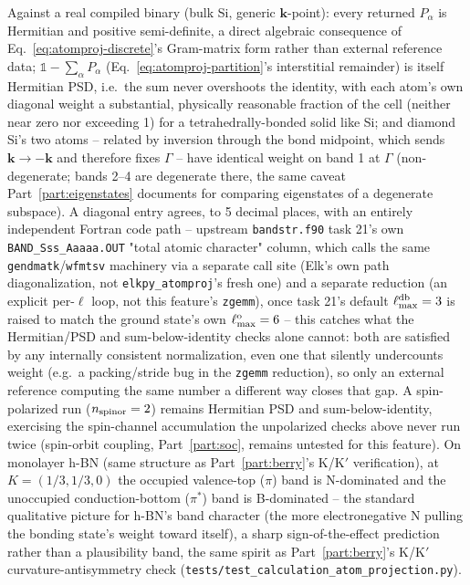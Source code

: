 \documentclass[11pt]{article}
\begin{document}
Against a real compiled binary (bulk Si, generic $\mathbf k$-point): every returned
$P_\alpha$ is Hermitian and positive semi-definite, a direct algebraic consequence of
Eq.~\eqref{eq:atomproj-discrete}'s Gram-matrix form rather than external reference data;
$\mathbb 1-\sum_\alpha P_\alpha$ (Eq.~\eqref{eq:atomproj-partition}'s interstitial
remainder) is itself Hermitian PSD, i.e.\ the sum never overshoots the identity, with
each atom's own diagonal weight a substantial, physically reasonable fraction of the
cell (neither near zero nor exceeding 1) for a tetrahedrally-bonded solid like Si; and
diamond Si's two atoms -- related by inversion through the bond midpoint, which sends
$\mathbf k\to-\mathbf k$ and therefore fixes $\Gamma$ -- have identical weight on band 1
at $\Gamma$ (non-degenerate; bands 2--4 are degenerate there, the same caveat
Part~\ref{part:eigenstates} documents for comparing eigenstates of a degenerate
subspace). A diagonal entry agrees, to 5 decimal places, with an entirely independent
Fortran code path -- upstream \texttt{bandstr.f90} task 21's own
\texttt{BAND\_Sss\_Aaaaa.OUT} "total atomic character" column, which calls the same
\texttt{gendmatk}/\texttt{wfmtsv} machinery via a separate call site (Elk's own path
diagonalization, not \texttt{elkpy\_atomproj}'s fresh one) and a separate reduction (an
explicit per-$\ell$ loop, not this feature's \texttt{zgemm}), once task 21's default
$\ell_{\rm max}^{\rm db}=3$ is raised to match the ground state's own $\ell_{\rm
max}^{\rm o}=6$ -- this catches what the Hermitian/PSD and sum-below-identity checks
alone cannot: both are satisfied by any internally consistent normalization, even one
that silently undercounts weight (e.g.\ a packing/stride bug in the \texttt{zgemm}
reduction), so only an external reference computing the same number a different way
closes that gap. A spin-polarized run ($n_{\rm spinor}=2$) remains Hermitian PSD and
sum-below-identity, exercising the spin-channel accumulation the unpolarized checks
above never run twice (spin-orbit coupling, Part~\ref{part:soc}, remains untested for
this feature). On monolayer h-BN (same structure as Part~\ref{part:berry}'s K/K$'$
verification), at $K=(1/3,1/3,0)$ the occupied valence-top ($\pi$) band is
N-dominated and the unoccupied conduction-bottom ($\pi^*$) band is B-dominated -- the
standard qualitative picture for h-BN's band character (the more electronegative N
pulling the bonding state's weight toward itself), a sharp sign-of-the-effect
prediction rather than a plausibility band, the same spirit as Part~\ref{part:berry}'s
K/K$'$ curvature-antisymmetry check
(\texttt{tests/test\_calculation\_atom\_projection.py}).
\end{document}
